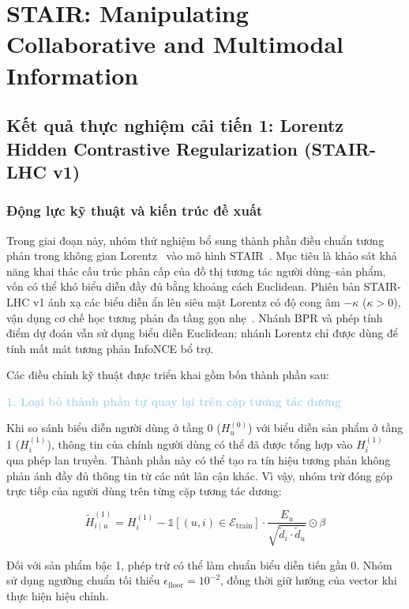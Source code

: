 \section{STAIR: Manipulating Collaborative and Multimodal Information}

\subsection{Kết quả thực nghiệm cải tiến 1: Lorentz Hidden Contrastive Regularization (STAIR-LHC v1)}

\subsubsection{Động lực kỹ thuật và kiến trúc đề xuất}

Trong giai đoạn này, nhóm thử nghiệm bổ sung thành phần điều chuẩn tương phản trong không gian Lorentz~\cite{nickel2018learning,chami2019hyperbolic} vào mô hình STAIR~\cite{xu2025stair}. Mục tiêu là khảo sát khả năng khai thác cấu trúc phân cấp của đồ thị tương tác người dùng--sản phẩm, vốn có thể khó biểu diễn đầy đủ bằng khoảng cách Euclidean. Phiên bản STAIR-LHC v1 ánh xạ các biểu diễn ẩn lên siêu mặt Lorentz có độ cong âm $-\kappa$ ($\kappa>0$), vận dụng cơ chế học tương phản đa tầng gọn nhẹ~\cite{yu2023xsimgcl}. Nhánh BPR và phép tính điểm dự đoán vẫn sử dụng biểu diễn Euclidean; nhánh Lorentz chỉ được dùng để tính mất mát tương phản InfoNCE bổ trợ.

Các điều chỉnh kỹ thuật được triển khai gồm bốn thành phần sau:

\noindent\textcolor{lightblue}{\textbf{1. Loại bỏ thành phần tự quay lại trên cặp tương tác dương}}

Khi so sánh biểu diễn người dùng ở tầng 0 ($H_u^{(0)}$) với biểu diễn sản phẩm ở tầng 1 ($H_i^{(1)}$), thông tin của chính người dùng có thể đã được tổng hợp vào $H_i^{(1)}$ qua phép lan truyền. Thành phần này có thể tạo ra tín hiệu tương phản không phản ánh đầy đủ thông tin từ các nút lân cận khác. Vì vậy, nhóm trừ đóng góp trực tiếp của người dùng trên từng cặp tương tác dương:

\begin{equation}
\widetilde{H}_{i\mid u}^{(1)}
=
H_i^{(1)}
-
\mathbb{1}\left[
(u,i)\in\mathcal{E}_{\mathrm{train}}
\right]
\cdot
\frac{E_u}
{\sqrt{\widetilde{d}_i\cdot\widetilde{d}_u}}
\odot\beta
\end{equation}

Đối với sản phẩm bậc 1, phép trừ có thể làm chuẩn biểu diễn tiến gần 0. Nhóm sử dụng ngưỡng chuẩn tối thiểu $\epsilon_{\mathrm{floor}}=10^{-2}$, đồng thời giữ hướng của vector khi thực hiện hiệu chỉnh.

